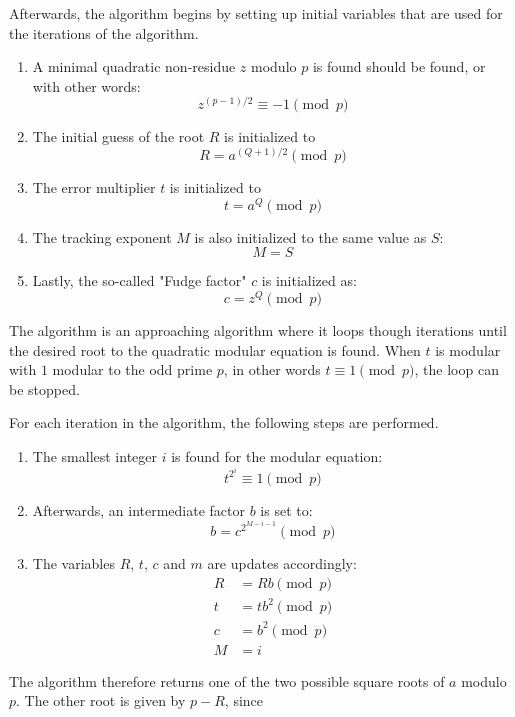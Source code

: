 \documentclass[11pt,a4paper]{article}
\begin{document}
Afterwards, the algorithm begins by setting up initial variables that are used for the iterations of the algorithm.

\begin{enumerate}
    \item A minimal quadratic non-residue $z$ modulo $p$ is found should be found, or with other words:
    \[
        z^{(p-1)/2} \equiv -1 \pmod p
    \]
    \item The initial guess of the root $R$ is initialized to
    \[
        R=a^{(Q+1)/2} \pmod p
    \]
    \item The error multiplier $t$ is initialized to
    \[
        t=a^Q \pmod p
    \]
    \item The tracking exponent $M$ is also initialized to the same value as $S$:
    \[
        M=S
    \]
    \item Lastly, the so-called "Fudge factor" $c$ is initialized as:
    \[
        c=z^Q \pmod p
    \]
\end{enumerate}


The algorithm is an approaching algorithm where it loops though iterations until the desired root to the quadratic modular equation is found. When $t$ is modular with $1$ modular to the odd prime $p$, in other words $t \equiv 1 \pmod p$, the loop can be stopped.

For each iteration in the algorithm, the following steps are performed.
\begin{enumerate}
 
    \item The smallest integer $i$ is found for the modular equation:
    \[
        t^{2^i} \equiv 1 \pmod p
    \]

    \item Afterwards, an intermediate factor $b$ is set to:
    \[
        b=c^{2^{M-i-1}} \pmod p
    \]

    \item The variables $R$, $t$, $c$ and $m$ are updates accordingly:
    \[
        \begin{aligned}
            R &= Rb \pmod p\\
            t &= tb^2 \pmod p\\
            c &= b^2 \pmod p\\
            M &= i
        \end{aligned}
    \]

\end{enumerate}

The algorithm therefore returns one of the two possible square roots of $a$ modulo $p$. The other root is given by $p-R$, since
\end{document}
